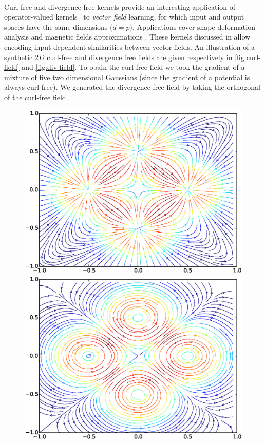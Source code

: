 \documentclass[twoside,11pt]{article}
\begin{document}
\paragraph{}
Curl-free and divergence-free kernels provide an interesting application of
operator-valued kernels~\citep{Macedo2008, Baldassare2012, Micheli2013} to
\emph{vector field} learning, for which input and output spaces have the same
dimensions ($d=p$). Applications cover shape deformation analysis
\citep{Micheli2013} and magnetic fields approximations \citep{Wahlstrom2013}.
These kernels discussed in \citep{Fuselier2006} allow encoding input-dependent
similarities between vector-fields. An illustration of a synthetic $2D$
curl-free and divergence free fields are given respectively in
\cref{fig:curl-field} and \cref{fig:div-field}. To obain the curl-free field we
took the gradient of a mixture of five two dimensional Gaussians (since the
gradient of a potential is always curl-free). We generated the divergence-free
field by taking the orthogonal of the curl-free field.
\begin{figure}
    \begin{minipage}{.5\textwidth}
        \centering
        \includegraphics[trim=1.8cm 1cm 2cm 1cm,width=.8\textwidth,clip=true]{./gfx/curl_field.eps}
    \end{minipage}%
    \begin{minipage}{0.5\textwidth}
        \centering
        \includegraphics[trim=1.8cm 1cm 2cm 1cm,width=.8\textwidth,clip=true]{./gfx/div_field.eps}
    \end{minipage}
\end{figure}
\end{document}

